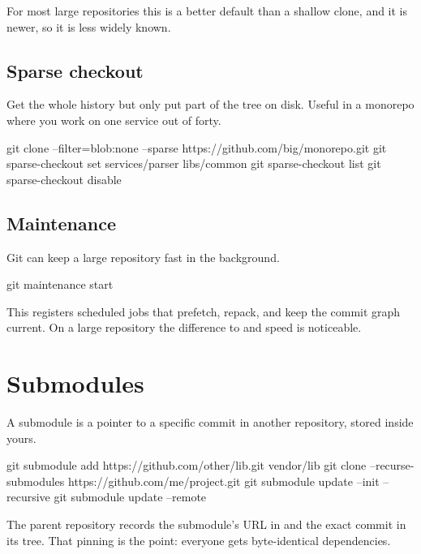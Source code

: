\documentclass[11pt]{article}
\begin{document}
For most large repositories this is a better default than a shallow clone, and it is
newer, so it is less widely known.

\subsection{Sparse checkout}

Get the whole history but only put part of the tree on disk. Useful in a monorepo
where you work on one service out of forty.

\begin{shell}
git clone --filter=blob:none --sparse https://github.com/big/monorepo.git
git sparse-checkout set services/parser libs/common
git sparse-checkout list
git sparse-checkout disable
\end{shell}

\subsection{Maintenance}

Git can keep a large repository fast in the background.

\begin{shell}
git maintenance start
\end{shell}

This registers scheduled jobs that prefetch, repack, and keep the commit graph
current. On a large repository the difference to  and 
speed is noticeable.

\section{Submodules}

A submodule is a pointer to a specific commit in another repository, stored inside
yours.

\begin{shell}
git submodule add https://github.com/other/lib.git vendor/lib
git clone --recurse-submodules https://github.com/me/project.git
git submodule update --init --recursive
git submodule update --remote
\end{shell}

The parent repository records the submodule's URL in  and the exact
commit in its tree. That pinning is the point: everyone gets byte-identical
dependencies.
\end{document}
